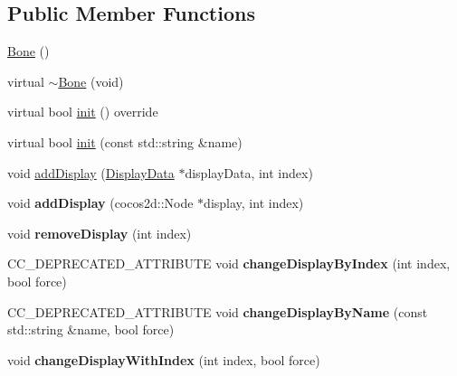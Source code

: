 \subsection*{Public Member Functions}
\begin{DoxyCompactItemize}
\item 
\hyperlink{classcocostudio_1_1Bone_a4ea993c9f4f8b5f2396087e86051d801}{Bone} ()
\item 
virtual \hyperlink{classcocostudio_1_1Bone_a92ca0403794ffd80423ead705f2c3559}{$\sim$\+Bone} (void)
\item 
virtual bool \hyperlink{classcocostudio_1_1Bone_a09affc6003ebdaf349d7c5cc4c62230e}{init} () override
\item 
virtual bool \hyperlink{classcocostudio_1_1Bone_a63ed071b7e91199d2ccf4499b0e6241d}{init} (const std\+::string \&name)
\item 
void \hyperlink{classcocostudio_1_1Bone_a9400051f055db9419231d6fb516bcd78}{add\+Display} (\hyperlink{classcocostudio_1_1DisplayData}{Display\+Data} $\ast$display\+Data, int index)
\item 
\mbox{\label{classcocostudio_1_1Bone_aaf7dcb2b91ea05721bc54574dee64ccc}} 
void {\bfseries add\+Display} (cocos2d\+::\+Node $\ast$display, int index)
\item 
\mbox{\label{classcocostudio_1_1Bone_ac372d5f1d2f8d23ecc3d6567ace6653a}} 
void {\bfseries remove\+Display} (int index)
\item 
\mbox{\label{classcocostudio_1_1Bone_a54fc524a669be814e13de9c84dbaf123}} 
C\+C\+\_\+\+D\+E\+P\+R\+E\+C\+A\+T\+E\+D\+\_\+\+A\+T\+T\+R\+I\+B\+U\+TE void {\bfseries change\+Display\+By\+Index} (int index, bool force)
\item 
\mbox{\label{classcocostudio_1_1Bone_ad659fc263acd302e35f5e3bfc9c8e26c}} 
C\+C\+\_\+\+D\+E\+P\+R\+E\+C\+A\+T\+E\+D\+\_\+\+A\+T\+T\+R\+I\+B\+U\+TE void {\bfseries change\+Display\+By\+Name} (const std\+::string \&name, bool force)
\item 
\mbox{\label{classcocostudio_1_1Bone_ad7715a8d6ee0d175d8755604961b9c27}} 
void {\bfseries change\+Display\+With\+Index} (int index, bool force)
\item 
\mbox{\label{classcocostudio_1_1Bone_ae2dc861a47c6354e80256803e738dfa5}} 

\end{DoxyCompactItemize}
